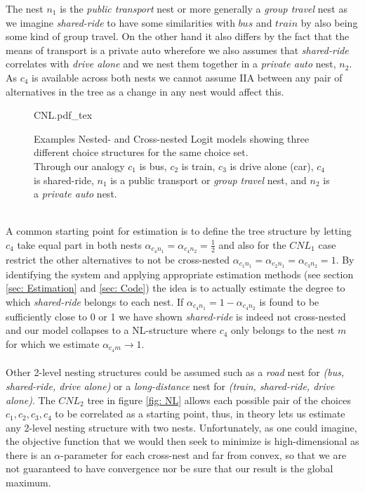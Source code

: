 The nest $n_1$ is the \textit{public transport} nest or more generally a \textit{group travel} nest as we imagine \textit{shared-ride} to have some similarities with $bus$ and $train$ by also being some kind of group travel. On the other hand it also differs by the fact that the means of transport is a private auto wherefore we also assumes that \textit{shared-ride} correlates with \textit{drive alone} and we nest them together in a \textit{private auto} nest, $n_2$. As $c_4$ is available across both nests we cannot assume IIA between any pair of alternatives in the tree as a change in any nest would affect this.
\\
  \begin{figure}[!h]
    \begin{center}
    \def\svgwidth{0.90\columnwidth}
    {CNL.pdf_tex}
    \end{center}
    \caption[Examples Nested- and Cross-nested Logit models showing three different choice structures for the same choice set.]{Examples Nested- and Cross-nested Logit models showing three different choice structures for the same choice set. \\
    Through our analogy $c_1$ is bus, $c_2$ is train, $c_3$ is drive alone (car), $c_4$ is shared-ride, $n_1$ is a public transport or \textit{group travel} nest, and $n_2$ is a \textit{private auto} nest.} \label{fig: CNL}
  \end{figure} \\
A common starting point for estimation is to define the tree structure by letting $c_4$ take equal part in both nests $\alpha_{c_4n_1}=\alpha_{c_4n_2}=\frac{1}{2}$ and also for the $CNL_1$ case restrict the other alternatives to not be cross-nested $\alpha_{c_1n_1}=\alpha_{c_2n_1}=\alpha_{c_3n_2}=1$. By identifying the system and applying appropriate estimation methods (see section \ref{sec: Estimation} and \ref{sec: Code}) the idea is to actually estimate the degree to which \textit{shared-ride} belongs to each nest. If $\alpha_{c_4n_1}=1-\alpha_{c_4n_2}$ is found to be sufficiently close to $0$ or 1 we have shown \textit{shared-ride} is indeed not cross-nested and our model collapses to a NL-structure where $c_4$ only belongs to the nest $m$ for which we estimate $\alpha_{c_4m}\rightarrow1$.
\\ \\
Other 2-level nesting structures could be assumed such as a \textit{road} nest for \textit{(bus, shared-ride, drive alone)} or a \textit{long-distance} nest for \textit{(train, shared-ride, drive alone)}. The $CNL_2$ tree in figure \ref{fig: NL} allows each possible pair of the choices $c_1,c_2,c_3,c_4$ to be correlated as a starting point, thus, in theory lets us estimate any 2-level nesting structure with two nests. Unfortunately, as one could imagine, the objective function that we would then seek to minimize is high-dimensional as there is an $\alpha$-parameter for each cross-nest and far from convex, so that we are not guaranteed to have convergence nor be sure that our result is the global maximum.

